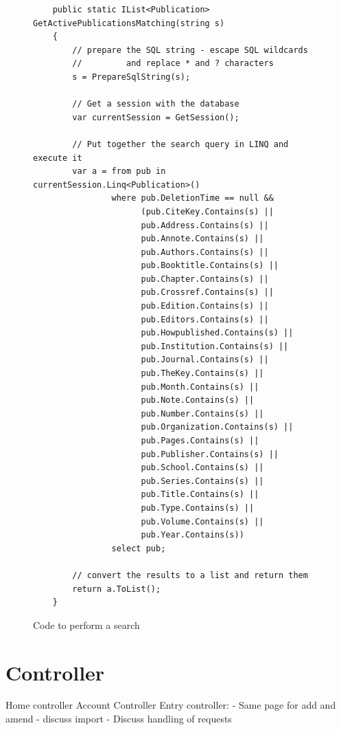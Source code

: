 \begin{figure}
	\begin{center}
			\lstset{language=CSharp} 
			\begin{lstlisting}
	public static IList<Publication> GetActivePublicationsMatching(string s)
	{
	    // prepare the SQL string - escape SQL wildcards 
	    //         and replace * and ? characters
	    s = PrepareSqlString(s);
	    
	    // Get a session with the database
	    var currentSession = GetSession();
	
	    // Put together the search query in LINQ and execute it
	    var a = from pub in currentSession.Linq<Publication>()
	            where pub.DeletionTime == null &&
	                  (pub.CiteKey.Contains(s) ||
	                  pub.Address.Contains(s) ||
	                  pub.Annote.Contains(s) ||
	                  pub.Authors.Contains(s) ||
	                  pub.Booktitle.Contains(s) ||
	                  pub.Chapter.Contains(s) ||
	                  pub.Crossref.Contains(s) ||
	                  pub.Edition.Contains(s) ||
	                  pub.Editors.Contains(s) ||
	                  pub.Howpublished.Contains(s) ||
	                  pub.Institution.Contains(s) ||
	                  pub.Journal.Contains(s) ||
	                  pub.TheKey.Contains(s) ||
	                  pub.Month.Contains(s) ||
	                  pub.Note.Contains(s) ||
	                  pub.Number.Contains(s) ||
	                  pub.Organization.Contains(s) ||
	                  pub.Pages.Contains(s) ||
	                  pub.Publisher.Contains(s) ||
	                  pub.School.Contains(s) ||
	                  pub.Series.Contains(s) ||
	                  pub.Title.Contains(s) ||
	                  pub.Type.Contains(s) ||
	                  pub.Volume.Contains(s) ||
	                  pub.Year.Contains(s))
	            select pub;
	
	    // convert the results to a list and return them
	    return a.ToList();
	}  		
			\end{lstlisting}
		\caption{Code to perform a search}
		\label{fig:PerformSearch}
	\end{center}
\end{figure}



\section{Controller}
Home controller
Account Controller
Entry controller:
 - Same page for add and amend
 - discuss import
 - 
Discuss handling of requests


